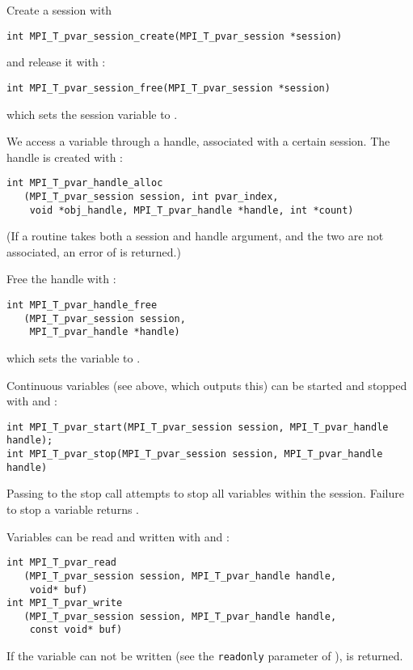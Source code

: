 \begin{mpifour}
Create a session with 
\begin{lstlisting}
int MPI_T_pvar_session_create(MPI_T_pvar_session *session)
\end{lstlisting}
and release it with :
\begin{lstlisting}
int MPI_T_pvar_session_free(MPI_T_pvar_session *session)
\end{lstlisting}
which sets the session variable to .

We access a variable through a handle, associated with a certain session.
The handle is created with :
\begin{lstlisting}
int MPI_T_pvar_handle_alloc
   (MPI_T_pvar_session session, int pvar_index,
    void *obj_handle, MPI_T_pvar_handle *handle, int *count)
\end{lstlisting}
(If a routine takes both a session and handle argument, and
the two are not associated, an error of 
is returned.)

Free the handle with :
\begin{lstlisting}
int MPI_T_pvar_handle_free
   (MPI_T_pvar_session session,
    MPI_T_pvar_handle *handle)
\end{lstlisting}
which sets the variable to .

Continuous variables (see  above, which outputs this)
can be started and stopped with
 and :
\begin{lstlisting}
int MPI_T_pvar_start(MPI_T_pvar_session session, MPI_T_pvar_handle handle);
int MPI_T_pvar_stop(MPI_T_pvar_session session, MPI_T_pvar_handle handle)
\end{lstlisting}
Passing  to the stop call
attempts to stop all variables within the session.
Failure to stop a variable returns .

Variables can be read and written with
 and :
\begin{lstlisting}
int MPI_T_pvar_read
   (MPI_T_pvar_session session, MPI_T_pvar_handle handle,
    void* buf)
int MPI_T_pvar_write
   (MPI_T_pvar_session session, MPI_T_pvar_handle handle,
    const void* buf)
\end{lstlisting}
If the variable can not be written
(see the \lstinline{readonly} parameter of ),
  is returned.


\end{mpifour}

